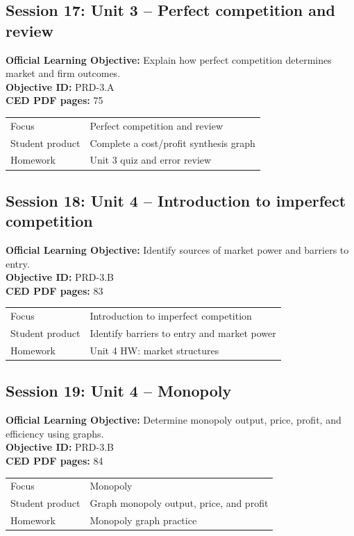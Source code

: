 \documentclass[11pt,a4paper]{article}
\newcommand{\objectivebox}[1]{\noindent\colorbox{aplight}{\parbox{0.96\textwidth}{#1}}}
\begin{document}
\subsection{Session 17: Unit 3 -- Perfect competition and review}
\objectivebox{\textbf{Official Learning Objective:} Explain how perfect competition determines market and firm outcomes.\\\textbf{Objective ID:} PRD-3.A\\\textbf{CED PDF pages:} 75}\par\vspace{0.4em}
\begin{tabularx}{\textwidth}{p{3.0cm}Y}
\toprule
Focus & Perfect competition and review\\
Student product & Complete a cost/profit synthesis graph\\
Homework & Unit 3 quiz and error review\\
\bottomrule
\end{tabularx}
\subsection{Session 18: Unit 4 -- Introduction to imperfect competition}
\objectivebox{\textbf{Official Learning Objective:} Identify sources of market power and barriers to entry.\\\textbf{Objective ID:} PRD-3.B\\\textbf{CED PDF pages:} 83}\par\vspace{0.4em}
\begin{tabularx}{\textwidth}{p{3.0cm}Y}
\toprule
Focus & Introduction to imperfect competition\\
Student product & Identify barriers to entry and market power\\
Homework & Unit 4 HW: market structures\\
\bottomrule
\end{tabularx}
\newpage
\subsection{Session 19: Unit 4 -- Monopoly}
\objectivebox{\textbf{Official Learning Objective:} Determine monopoly output, price, profit, and efficiency using graphs.\\\textbf{Objective ID:} PRD-3.B\\\textbf{CED PDF pages:} 84}\par\vspace{0.4em}
\begin{tabularx}{\textwidth}{p{3.0cm}Y}
\toprule
Focus & Monopoly\\
Student product & Graph monopoly output, price, and profit\\
Homework & Monopoly graph practice\\
\bottomrule
\end{tabularx}
\end{document}
